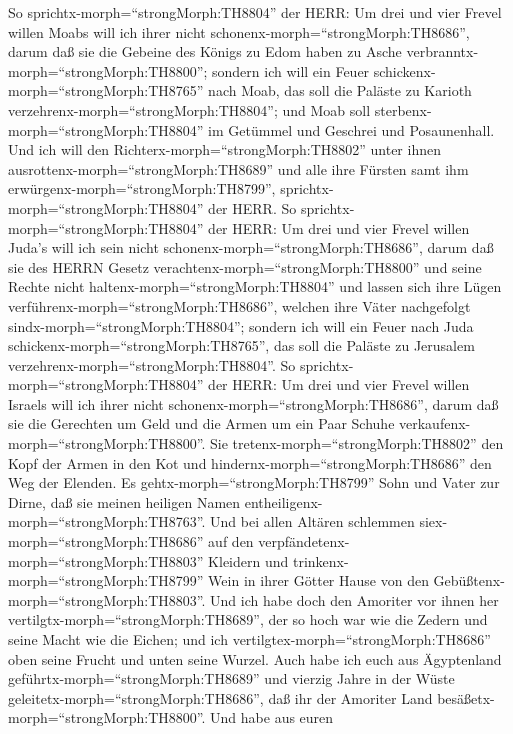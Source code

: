  So sprichtx-morph=``strongMorph:TH8804'' der HERR: Um drei
und vier Frevel willen Moabs will ich ihrer nicht
schonenx-morph=``strongMorph:TH8686'', darum daß sie die Gebeine des
Königs zu Edom haben zu Asche verbranntx-morph=``strongMorph:TH8800'';
 sondern ich will ein Feuer
schickenx-morph=``strongMorph:TH8765'' nach Moab, das soll die Paläste
zu Karioth verzehrenx-morph=``strongMorph:TH8804''; und Moab soll
sterbenx-morph=``strongMorph:TH8804'' im Getümmel und Geschrei und
Posaunenhall.  Und ich will den
Richterx-morph=``strongMorph:TH8802'' unter ihnen
ausrottenx-morph=``strongMorph:TH8689'' und alle ihre Fürsten samt ihm
erwürgenx-morph=``strongMorph:TH8799'',
sprichtx-morph=``strongMorph:TH8804'' der HERR.  So
sprichtx-morph=``strongMorph:TH8804'' der HERR: Um drei und vier Frevel
willen Juda's will ich sein nicht schonenx-morph=``strongMorph:TH8686'',
darum daß sie des HERRN Gesetz verachtenx-morph=``strongMorph:TH8800''
und seine Rechte nicht haltenx-morph=``strongMorph:TH8804'' und lassen
sich ihre Lügen verführenx-morph=``strongMorph:TH8686'', welchen ihre
Väter nachgefolgt sindx-morph=``strongMorph:TH8804''; 
sondern ich will ein Feuer nach Juda
schickenx-morph=``strongMorph:TH8765'', das soll die Paläste zu
Jerusalem verzehrenx-morph=``strongMorph:TH8804''.  So
sprichtx-morph=``strongMorph:TH8804'' der HERR: Um drei und vier Frevel
willen Israels will ich ihrer nicht
schonenx-morph=``strongMorph:TH8686'', darum daß sie die Gerechten um
Geld und die Armen um ein Paar Schuhe
verkaufenx-morph=``strongMorph:TH8800''.  Sie
tretenx-morph=``strongMorph:TH8802'' den Kopf der Armen in den Kot und
hindernx-morph=``strongMorph:TH8686'' den Weg der Elenden. Es
gehtx-morph=``strongMorph:TH8799'' Sohn und Vater zur Dirne, daß sie
meinen heiligen Namen entheiligenx-morph=``strongMorph:TH8763''.
 Und bei allen Altären schlemmen
siex-morph=``strongMorph:TH8686'' auf den
verpfändetenx-morph=``strongMorph:TH8803'' Kleidern und
trinkenx-morph=``strongMorph:TH8799'' Wein in ihrer Götter Hause von den
Gebüßtenx-morph=``strongMorph:TH8803''.  Und ich habe doch
den Amoriter vor ihnen her vertilgtx-morph=``strongMorph:TH8689'', der
so hoch war wie die Zedern und seine Macht wie die Eichen; und ich
vertilgtex-morph=``strongMorph:TH8686'' oben seine Frucht und unten
seine Wurzel.  Auch habe ich euch aus Ägyptenland
geführtx-morph=``strongMorph:TH8689'' und vierzig Jahre in der Wüste
geleitetx-morph=``strongMorph:TH8686'', daß ihr der Amoriter Land
besäßetx-morph=``strongMorph:TH8800''.  Und habe aus euren
